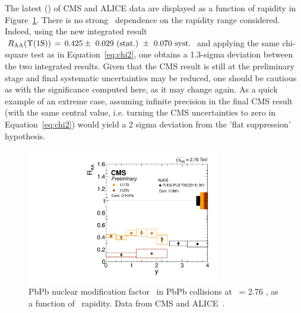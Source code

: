 The latest \RAA(\PgUa) of CMS and ALICE data are displayed as a function of
rapidity in Figure~\ref{fig:ALICE_CMS_rap}. There is no strong \RAA\
dependence on the rapidity range considered. Indeed, using the new
integrated result $\RAA(\PgUa)\,=\,0.425 \pm\ 0.029~\textrm{(stat.)}~\pm\
0.070~\textrm{syst.}$ and applying the same chi-square test as in
Equation~\ref{eq:chi2}, one obtains a 1.3-sigma deviation between the
two integrated results. Given that the CMS result is still at the
preliminary stage and final systematic uncertainties may be reduced,
one should be cautious as with the significance computed here, as it
may change again. As a quick example of an extreme case, assuming infinite
precision in the final CMS result (with the same central value, i.e. turning the CMS uncertainties to zero in Equation~\ref{eq:chi2})
would yield a 2 sigma deviation from the 'flat suppression' hypothesis. 
\begin{figure}[h]
  \begin{centering}  
    \includegraphics[width=0.75\textwidth]{Chapters/aUpsilon/ALICE_CMS_rapidity.pdf}
    \caption{PbPb nuclear modification factor \RAA\ in PbPb collisions
    at \snn\ = 2.76 \TeV, as a function of \PgU\ rapidity. Data from CMS and ALICE~\cite{ALICEUpsilonHI}.}
    \label{fig:ALICE_CMS_rap}
  \end{centering}  
\end{figure}




